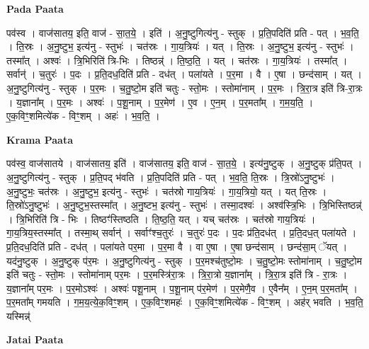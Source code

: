 \documentclass[17pt]{extarticle}
\begin{document}
\textbf{Pada Paata} \newline

पव॑स्व । वाज॑सातय॒ इति॒ वाज॑ - सा॒त॒ये॒ । इति॑ । अ॒नु॒ष्टुगित्य॑नु - स्तुक् । प्र॒ति॒पदिति॑ प्रति - पत् । भ॒व॒ति॒ । ति॒स्रः । अ॒नु॒ष्टुभ॒ इत्य॑नु - स्तुभः॑ । चत॑स्रः । गा॒य॒त्रियः॑ । यत् । ति॒स्रः । अ॒नु॒ष्टुभ॒ इत्य॑नु - स्तुभः॑ । तस्मा᳚त् । अश्वः॑ । त्रि॒भिरिति॑ त्रि-भिः । तिष्ठन्न्॑ । ति॒ष्ठ॒ति॒ । यत् । चत॑स्रः । गा॒य॒त्रियः॑ । तस्मा᳚त् । सर्वान्॑ । च॒तुरः॑ । प॒दः । प्र॒ति॒दध॒दिति॑ प्रति - दध॑त् । पला॑यते । प॒र॒मा । वै । ए॒षा । छन्द॑साम् । यत् । अ॒नु॒ष्टुगित्य॑नु - स्तुक् । प॒र॒मः । च॒तु॒ष्टो॒म इति॑ चतुः - स्तो॒मः । स्तोमा॑नाम् । प॒र॒मः । त्रि॒रा॒त्र इति॑ त्रि-रा॒त्रः । य॒ज्ञाना᳚म् । प॒र॒मः । अश्वः॑ । प॒शू॒नाम् । प॒र॒मेण॑ । ए॒व । ए॒न॒म् । प॒र॒मता᳚म् । ग॒म॒य॒ति॒ । ए॒क॒विꣳ॒॒शमित्ये॑क - विꣳ॒॒शम् । अहः॑ । भ॒व॒ति॒ ।  \newline


\textbf{Krama Paata} \newline

पव॑स्व॒ वाज॑सातये । वाज॑सातय॒ इति॑ । वाज॑सातय॒ इति॒ वाज॑ - सा॒त॒ये॒ । इत्य॑नु॒ष्टुक् । अ॒नु॒ष्टुक् प्र॑ति॒पत् । अ॒नु॒ष्टुगित्य॑नु - स्तुक् । प्र॒ति॒पद् भ॑वति । प्र॒ति॒पदिति॑ प्रति - पत् । भ॒व॒ति॒ ति॒स्रः । त्रि॒स्रो॑ऽनु॒ष्टुभः॑ । अ॒नु॒ष्टुभः॒ चत॑स्रः । अ॒नु॒ष्टुभ॒ इत्य॑नु - स्तुभः॑ । चत॑स्रो गाय॒त्रियः॑ । गा॒य॒त्रियो॒ यत् । यत् ति॒स्रः । ति॒स्रो॑ऽनु॒ष्टुभः॑ । अ॒नु॒ष्टुभ॒स्तस्मा᳚त् । अ॒नु॒ष्टभ॒ इत्य॑नु - स्तुभः॑ । तस्मा॒दश्वः॑ । अश्व॑स्त्रि॒भिः । त्रि॒भिस्तिष्ठन्न्॑ । त्रि॒भिरिति॑ त्रि - भिः । तिष्ठꣳ॑स्तिष्ठति । ति॒ष्ठ॒ति॒ यत् । यच् चत॑स्रः । चत॑स्रो गाय॒त्रियः॑ । गा॒य॒त्रिय॒स्तस्मा᳚त् । तस्मा॒थ् सर्वान्॑ । सर्वाꣳ॑श्च॒तुरः॑ । च॒तुरः॑ प॒दः । प॒दः प्र॑ति॒दध॑त् । प्र॒ति॒दध॒त् पला॑यते । प्र॒ति॒दध॒दिति॑ प्रति - दध॑त् । पला॑यते पर॒मा । प॒र॒मा वै । वा ए॒षा । ए॒षा छन्द॑साम् । छन्द॑सा॒म् ॅयत् । यद॑नु॒ष्टुक् । अ॒नु॒ष्टुक् प॑र॒मः । अ॒नु॒ष्टुगित्य॑नु - स्तुक् । प॒र॒मश्च॑तुष्टो॒मः । च॒तु॒ष्टो॒मः स्तोमा॑नाम् । च॒तु॒ष्टो॒म इति॑ चतुः - स्तो॒मः । स्तोमा॑नाम् पर॒मः । प॒र॒मस्त्रि॑रा॒त्रः । त्रि॒रा॒त्रो य॒ज्ञाना᳚म् । त्रि॒रा॒त्र इति॑ त्रि - रा॒त्रः । य॒ज्ञाना᳚म् पर॒मः । प॒र॒मोऽश्वः॑ । अश्वः॑ पशू॒नाम् । प॒शू॒नाम् प॑र॒मेण॑ । प॒र॒मेणै॒व । ए॒वैन᳚म् । ए॒न॒म् प॒र॒मता᳚म् । प॒र॒मता᳚म् गमयति । ग॒म॒य॒त्ये॒क॒विꣳ॒॒शम् । ए॒क॒विꣳ॒॒शमहः॑ । ए॒क॒विꣳ॒॒शमित्ये॑क - विꣳ॒॒शम् । अह॑र् भवति । भ॒व॒ति॒ यस्मिन्न्॑ \newline

\textbf{Jatai Paata} \newline
\end{document}
